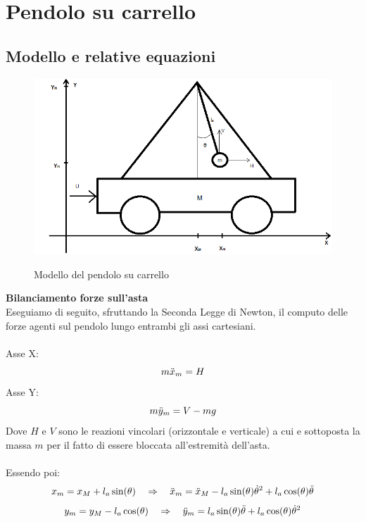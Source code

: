 \chapter{Pendolo su carrello}\label{PendCarrello}
\section{Modello e relative equazioni}
\begin{figure}[ht]
	\centering
	\includegraphics[width=\textwidth]{pendolo.png}\\
	\caption{Modello del pendolo su carrello}
	\label{pendolo}
\end{figure}
\textbf{Bilanciamento forze sull'asta}\\
Eseguiamo di seguito, sfruttando la Seconda Legge di Newton, il computo delle forze agenti sul pendolo lungo entrambi gli assi cartesiani.\\\\
Asse X:
\begin{equation}\notag
m\ddot{x}_m=H
\end{equation}
Asse Y:
\begin{equation}\notag
m\ddot{y}_m=V-mg
\end{equation}
Dove $H$ e $V$ sono le reazioni vincolari (orizzontale e verticale) a cui e sottoposta la massa $m$ per il fatto di essere bloccata all'estremità dell'asta.\\ \\
Essendo poi:\\
\begin{equation}\notag
x_m = x_M+l_a\sin(\theta) \quad \Rightarrow \quad \ddot{x}_m=\ddot{x}_M-l_a\sin(\theta)\dot{\theta}^2+l_a\cos(\theta)\ddot{\theta}
\end{equation}
\begin{equation}\notag
y_m=y_M-l_a\cos(\theta) \quad \Rightarrow \quad \ddot{y}_m=l_a\sin(\theta)\ddot{\theta}+l_a\cos(\theta)\dot{\theta}^2
\end{equation}
